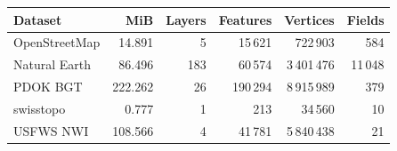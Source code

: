 \begingroup\small\setlength{\tabcolsep}{3pt}
\begin{longtable}{lrrrrr}
\toprule
Dataset & MiB & Layers & Features & Vertices & Fields \\
\midrule
OpenStreetMap & 14.891 & 5 & 15\,621 & 722\,903 & 584 \\
Natural Earth & 86.496 & 183 & 60\,574 & 3\,401\,476 & 11\,048 \\
PDOK BGT & 222.262 & 26 & 190\,294 & 8\,915\,989 & 379 \\
swisstopo & 0.777 & 1 & 213 & 34\,560 & 10 \\
USFWS NWI & 108.566 & 4 & 41\,781 & 5\,840\,438 & 21 \\
\bottomrule
\end{longtable}
\endgroup
